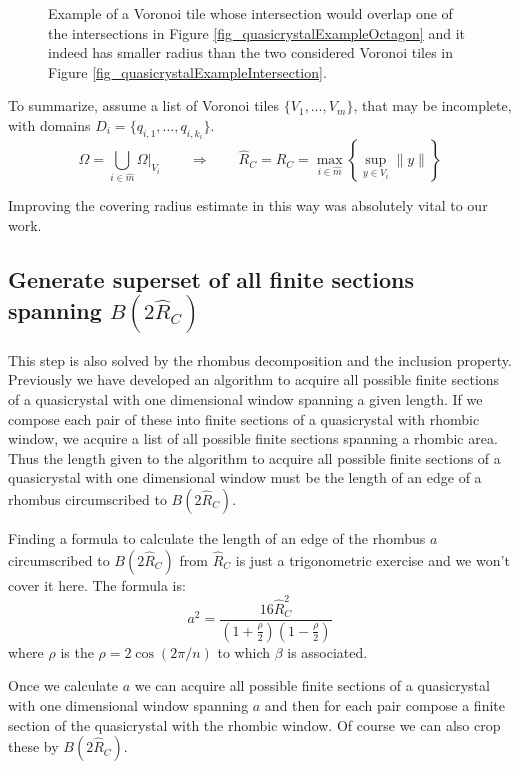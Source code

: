 \documentclass[text.tex]{subfiles}
\begin{document}
\begin{figure}[h!]
\begin{minipage}{0.4\textwidth}
\end{minipage}
\caption{Example of a Voronoi tile whose intersection would overlap one of the intersections in Figure \ref{fig_quasicrystalExampleOctagon} and it indeed has smaller radius than the two considered Voronoi tiles in Figure \ref{fig_quasicrystalExampleIntersection}. }
\label{fig_quasicrystalExampleIntersection02}
\end{figure}

To summarize, assume a list of Voronoi tiles $\{V_1,\dots,V_m\}$, that may be incomplete, with domains $D_i = \{q_{i,1},\dots,q_{i,k_i}\}$. 
$$\Omega = \bigcup\limits_{i\in\hat{m}}\Omega|_{V_i} \qquad\Rightarrow\qquad \hat{R}_C = R_C = \max_{i\in\hat{m}}\left\{\sup_{y\in V_i}\lVert y\rVert\right\}$$

Improving the covering radius estimate in this way was absolutely vital to our work. 

\subsection{Generate superset of all finite sections spanning $B(2\hat{R}_C)$}
This step is also solved by the rhombus decomposition and the inclusion property. Previously we have developed an algorithm to acquire all possible finite sections of a quasicrystal with one dimensional window spanning a given length. If we compose each pair of these into finite sections of a quasicrystal with rhombic window, we acquire a list of all possible finite sections spanning a rhombic area. Thus the length given to the algorithm to acquire all possible finite sections of a quasicrystal with one dimensional window must be the length of an edge of a rhombus circumscribed to $B(2\hat{R}_C)$. 

Finding a formula to calculate the length of an edge of the rhombus $a$ circumscribed to $B(2\hat{R}_C)$ from $\hat{R}_C$ is just a trigonometric exercise and we won't cover it here. The formula is: 
$$a^2 = \frac{16\hat{R}_C^2}{\left(1+\frac{\rho}{2}\right)\left(1-\frac{\rho}{2}\right)}$$
where $\rho$ is the $\rho=2\cos\left(2\pi/n\right)$ to which $\beta$ is associated. 

Once we calculate $a$ we can acquire all possible finite sections of a quasicrystal with one dimensional window spanning $a$ and then for each pair compose a finite section of the quasicrystal with the rhombic window. Of course we can also crop these by $B(2\hat{R}_C)$. 
\end{document}
